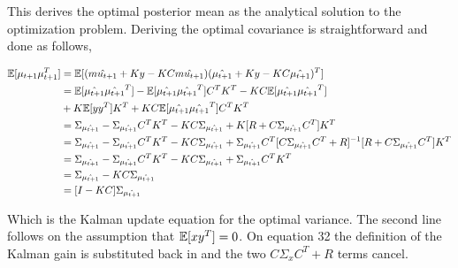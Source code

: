 This derives the optimal posterior mean as the analytical solution to the optimization problem. Deriving the optimal covariance is straightforward and done as follows,

\begin{align}
    \mathbb{E}[\mu_{t+1} \mu_{t+1}^T] &= \mathbb{E}[(\hat{mu_{t+1}} + Ky - KC\hat{mu_{t+1}})(\hat{\mu_{t+1}} + Ky - KC\hat{\mu_{t+1}})^T] \\
    &= \mathbb{E}[\hat{\mu_{t+1}}\hat{\mu_{t+1}}^T] - \mathbb{E}[\hat{\mu_{t+1}}\hat{\mu_{t+1}}^T]C^T K^T - K C \mathbb{E}[\hat{\mu_{t+1}}\hat{\mu_{t+1}}^T] \\ &+ K \mathbb{E}[y y^T]K^T + K C \mathbb{E}[\hat{\mu_{t+1}}\hat{\mu_{t+1}}^T]C^T K^T \\
    &= \Sigma_{\hat{\mu_{t+1}}} - \Sigma_{\hat{\mu_{t+1}}} C^T K^T - KC \Sigma_{\hat{\mu_{t+1}}} + K[R + C\Sigma_{\hat{\mu_{t+1}}}C^T]K^T \\
   &=  \Sigma_{\hat{\mu_{t+1}}} - \Sigma_{\hat{\mu_{t+1}}} C^T K^T - KC \Sigma_{\hat{\mu_{t+1}}} + \Sigma_{\hat{\mu_{t+1}}}C^T[C\Sigma_{\hat{\mu_{t+1}}}C^T +R]^{-1}[R + C\Sigma_{\hat{\mu_{t+1}}}C^T]K^T \\
   &= \Sigma_{\hat{\mu_{t+1}}} - \Sigma_{\hat{\mu_{t+1}}} C^T K^T - KC \Sigma_{\hat{\mu_{t+1}}} +  \Sigma_{\hat{\mu_{t+1}}} C^T K^T \\
   &= \Sigma_{\hat{\mu_{t+1}}} - KC \Sigma_{\hat{\mu_{t+1}}} \\
   &= [I - KC]\Sigma_{\hat{\mu_{t+1}}}
\end{align}

Which is the Kalman update equation for the optimal variance. The second line follows on the assumption that $\mathbb{E}[x y^T] = 0$. On equation 32 the definition of the Kalman gain is substituted back in and the two $C\Sigma_x C^T + R$ terms cancel.

